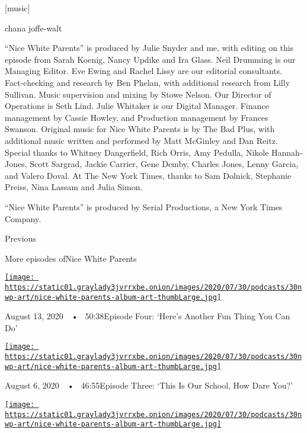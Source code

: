 {[}music{]}

chana joffe-walt

``Nice White Parents'' is produced by Julie Snyder and me, with editing
on this episode from Sarah Koenig, Nancy Updike and Ira Glass. Neil
Drumming is our Managing Editor. Eve Ewing and Rachel Lissy are our
editorial consultants. Fact-checking and research by Ben Phelan, with
additional research from Lilly Sullivan. Music supervision and mixing by
Stowe Nelson. Our Director of Operations is Seth Lind. Julie Whitaker is
our Digital Manager. Finance management by Cassie Howley, and Production
management by Frances Swanson. Original music for Nice White Parents is
by The Bad Plus, with additional music written and performed by Matt
McGinley and Dan Reitz. Special thanks to Whitney Dangerfield, Rich
Orris, Amy Pedulla, Nikole Hannah-Jones, Scott Sargrad, Jackie Carrier,
Gene Demby, Charles Jones, Lenny Garcia, and Valero Doval. At The New
York Times, thanks to Sam Dolnick, Stephanie Preiss, Nina Lassam and
Julia Simon.

``Nice White Parents'' is produced by Serial Productions, a New York
Times Company.

Previous

More episodes ofNice White Parents

\href{https://www.nytimes3xbfgragh.onion/2020/08/13/podcasts/nice-white-parents-school.html?action=click\&module=audio-series-bar\&region=header\&pgtype=Article}{\texttt{[image: https://static01.graylady3jvrrxbe.onion/images/2020/07/30/podcasts/30nwp-art/nice-white-parents-album-art-thumbLarge.jpg]}}

August 13, 2020~~•~ 50:38Episode Four: `Here's Another Fun Thing You Can
Do'

\href{https://www.nytimes3xbfgragh.onion/2020/08/06/podcasts/episode-three-this-is-our-school-how-dare-you.html?action=click\&module=audio-series-bar\&region=header\&pgtype=Article}{\texttt{[image: https://static01.graylady3jvrrxbe.onion/images/2020/07/30/podcasts/30nwp-art/nice-white-parents-album-art-thumbLarge.jpg]}}

August 6, 2020~~•~ 46:55Episode Three: `This Is Our School, How Dare
You?'

\href{https://www.nytimes3xbfgragh.onion/2020/07/30/podcasts/nice-white-parents-serial-2.html?action=click\&module=audio-series-bar\&region=header\&pgtype=Article}{\texttt{[image: https://static01.graylady3jvrrxbe.onion/images/2020/07/30/podcasts/30nwp-art/nice-white-parents-album-art-thumbLarge.jpg]}}

